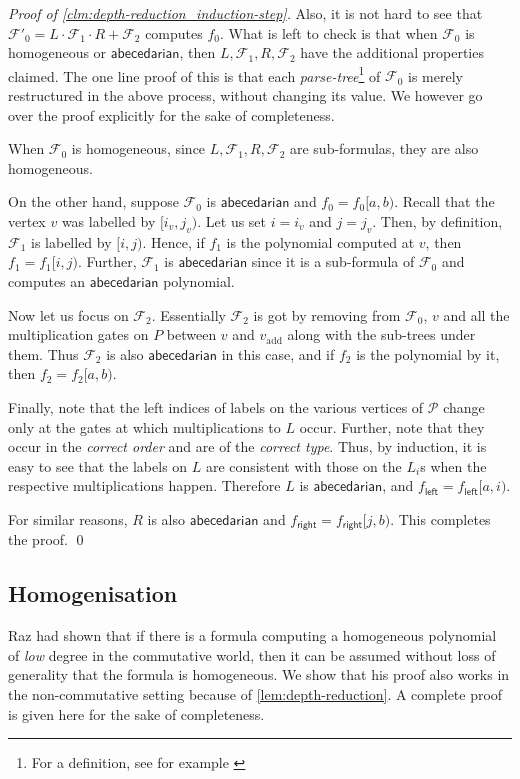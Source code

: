 \documentclass[10pt,a4paper]{article}
\newcommand{\form}{\textbf{$\mathcal{F}$}}
\renewcommand{\l}{\mathsf{left}}
\renewcommand{\r}{\mathsf{right}}
\newcommand{\abcd}{\mathsf{abecedarian}}
\newenvironment{proofof}[1]{\medskip\noindent\emph{Proof of #1.}\hspace*{1em}}{\qed\bigskip}
\begin{document}
\begin{proofof}{\autoref{clm:depth-reduction_induction-step}}
	Also, it is not hard to see that $\form'_0 = L \cdot \form_1 \cdot R + \form_2$ computes $f_0$. 
	What is left to check is that when $\form_0$ is homogeneous or $\abcd$, then $L, \form_1, R, \form_2$ have the additional properties claimed.
	The one line proof of this is that each \emph{parse-tree}\footnote{For a definition, see for example \cite{LLS19}} of $\form_0$ is merely restructured in the above process, without changing its value.
	We however go over the proof explicitly for the sake of completeness.
	
	When $\form_0$ is homogeneous, since $L, \form_1, R, \form_2$ are sub-formulas, they are also homogeneous.

	\noindent On the other hand, suppose $\form_0$ is $\abcd$ and $f_0 = f_0[a,b)$.
	Recall that the vertex $v$ was labelled by $[i_v, j_v)$.
	Let us set $i = i_v$ and $j=j_v$. 
	Then, by definition, $\form_1$ is  labelled by $[i,j)$.
	Hence, if $f_1$ is the polynomial computed at $v$, then $f_1 = f_1[i,j)$.
	Further, $\form_1$ is $\abcd$ since it is a sub-formula of $\form_0$ and computes an $\abcd$ polynomial.

	Now let us focus on $\form_2$.
	Essentially $\form_2$ is got by removing from $\form_0$, $v$ and all the multiplication gates on $P$ between $v$ and $v_{\text{add}}$ along with the sub-trees under them.
	Thus $\form_2$ is also $\abcd$ in this case, and if $f_2$ is the polynomial by it, then $f_2 = f_2[a,b)$.
	
	Finally, note that the left indices of labels on the various vertices of $\mathcal{P}$ change only at the gates at which multiplications to $L$ occur.
	Further, note that they occur in the \emph{correct order} and are of the \emph{correct type}.
	Thus, by induction, it is easy to see that the labels on $L$ are consistent with those on the $L_i$s when the respective multiplications happen.
	Therefore $L$ is $\abcd$, and $f_\l = f_\l[a,i)$.	
	
	For similar reasons, $R$ is also $\abcd$ and $f_\r = f_\r[j,b)$.
	This completes the proof.
\end{proofof}

\subsection{Homogenisation}\label{sec:homogenisation}

Raz \cite{R13} had shown that if there is a formula computing a homogeneous polynomial of \emph{low} degree in the commutative world, then it can be assumed without loss of generality that the formula is homogeneous.
We show that his proof also works in the non-commutative setting because of \autoref{lem:depth-reduction}. 
A complete proof is given here for the sake of completeness.
\end{document}
